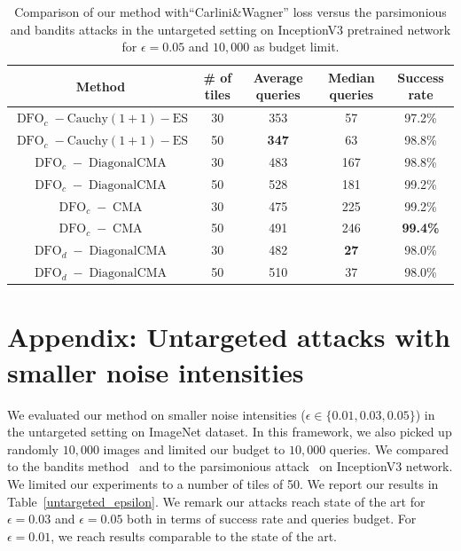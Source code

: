\begin{table}[htb]
\caption{Comparison of our method with``Carlini\&Wagner'' loss versus the parsimonious and bandits attacks in the untargeted setting on InceptionV3 pretrained network for $\epsilon=0.05$ and $10,000$ as budget limit. }
\label{untargeted_cw}
\begin{center}
\begin{tabular}{cc|cc|c}
\textbf{Method} & \textbf{\# of tiles} &  \textbf{Average queries} &\textbf{ Median queries }& \textbf{Success rate} \\
\hline
$\operatorname{DFO}_c-\operatorname{Cauchy (1+1)-ES}$ & 30&353	&57	&97.2\%\\
$\operatorname{DFO}_c-\operatorname{Cauchy (1+1)-ES}$ &50&\textbf{347}&	63&	98.8\%\\

\hline

$\operatorname{DFO}_c-\operatorname{DiagonalCMA}$ & 30&	483	&167&	98.8\%\\
$\operatorname{DFO}_c-\operatorname{DiagonalCMA}$  & 50&	528	&181&	99.2\%\\


\hline
$\operatorname{DFO}_c-\operatorname{CMA}$ & 30&	475	&225&	99.2\%\\
$\operatorname{DFO}_c-\operatorname{CMA}$ & 50&	491	&246	&\textbf{99.4\%}\\

\hline
$\operatorname{DFO}_d-\operatorname{DiagonalCMA}$  &30&	482 &	\textbf{27}&	98.0\%\\
$\operatorname{DFO}_d-\operatorname{DiagonalCMA}$  &50&	510& 37	&	98.0\%\\
\end{tabular}
\end{center}
\end{table}



\newpage
\section{Appendix: Untargeted attacks with smaller noise intensities}
\label{smaller}
We evaluated our method on smaller noise intensities ($\epsilon\in\{0.01,0.03,0.05\}$) in the untargeted setting on ImageNet dataset. In this framework, we also picked up randomly $10,000$ images and limited our budget to $10,000$ queries. We compared to the bandits method~\citep{ilyas2018prior} and to the parsimonious attack~\citep{moon19aparsimonous} on InceptionV3 network. We limited our experiments to a number of tiles of 50. We report our results in Table~\ref{untargeted_epsilon}. We remark our attacks reach state of the art for $\epsilon=0.03$ and $\epsilon=0.05$ both in terms of success rate and queries budget. For $\epsilon=0.01$, we reach results comparable to the state of the art.

